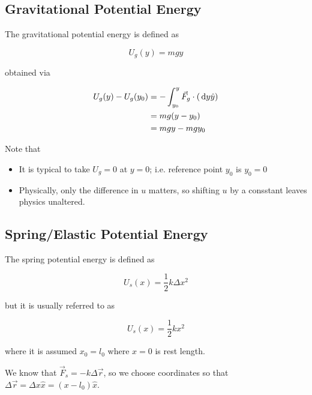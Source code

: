 \subsection{Gravitational Potential Energy}

\begin{definition}
	The gravitational potential energy is defined as

	\begin{equation}
		U_g(y) = mgy
	\end{equation}
\end{definition}

obtained via

\begin{align}
	U_g(y) - U_g(y_0) &= - \int_{y_0}^y \vec F_g \cdot \left(\D y \hat y\right)\\
	&= mg (y - y_0)\\
	&= mgy - mgy_0
\end{align}

Note that

\begin{itemize}
	\item It is typical to take $U_g = 0$ at $y = 0$; i.e. reference point $y_0$ is $y_0 = 0$
	\item Physically, only the difference in $u$ matters, so shifting $u$ by a consstant leaves physics unaltered.
\end{itemize}

\subsection{Spring/Elastic Potential Energy}

\begin{definition}
	The spring potential energy is defined as

	\begin{equation}
		U_s(x) = \frac{1}{2} k \Delta x^2
	\end{equation}

	but it is usually referred to as

	\begin{equation}
		U_s(x) = \frac{1}{2} k x^2
	\end{equation}

	where it is assumed $x_0 = l_0$ where $x = 0$ is rest length.
\end{definition}

We know that $\vec F_s = -k\Delta \vec r$, so we choose coordinates so that $\Delta \vec r = \Delta x \hat x = (x - l_0) \hat x$.

